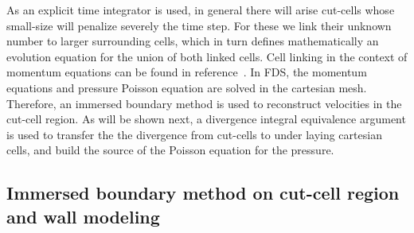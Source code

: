 \documentclass[journal,article,atmosphere,submit,moreauthors,pdftex]{Definitions/mdpi}
\begin{document}
As an explicit time integrator is used, in general there will arise cut-cells whose small-size will penalize severely the time step. For these we link their unknown number to larger surrounding cells, which in turn defines mathematically an evolution equation for the union of both linked cells. Cell linking in the context of momentum equations can be found in reference~\cite{kirk_2003}.
In FDS, the momentum equations and pressure Poisson equation are solved in the cartesian mesh. Therefore, an immersed boundary method is used to reconstruct velocities in the cut-cell region. As will be shown next, a divergence integral equivalence argument is used to transfer the the divergence from cut-cells to under laying cartesian cells, and build the source of the Poisson equation for the pressure. 


\subsection{Immersed boundary method on cut-cell region and wall modeling}
\end{document}
